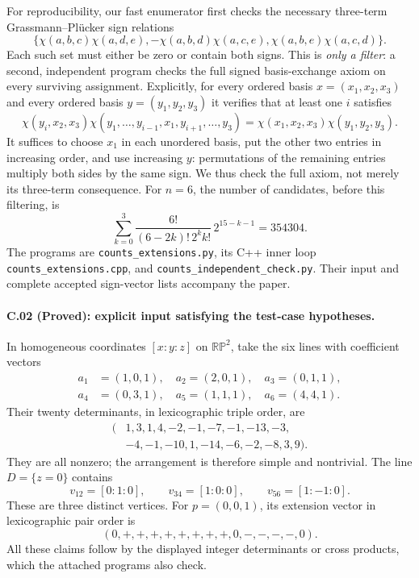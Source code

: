 For reproducibility, our fast enumerator first checks the necessary
three-term Grassmann--Pl\"ucker sign relations
\[
 \bigl\{
 \chi(a,b,c)\chi(a,d,e),
 -\chi(a,b,d)\chi(a,c,e),
 \chi(a,b,e)\chi(a,c,d)
 \bigr\}.
\]
Each such set must either be zero or contain both signs. This is
\emph{only a filter}: a second, independent program checks the full
signed basis-exchange axiom on every surviving assignment. Explicitly,
for every ordered basis $x=(x_1,x_2,x_3)$ and every ordered basis
$y=(y_1,y_2,y_3)$ it verifies that at least one $i$ satisfies
\[
 \chi(y_i,x_2,x_3)
 \chi(y_1,\ldots,y_{i-1},x_1,y_{i+1},\ldots,y_3)
 =\chi(x_1,x_2,x_3)\chi(y_1,y_2,y_3).
\]
It suffices to choose $x_1$ in each unordered basis, put the other two
entries in increasing order, and use increasing $y$: permutations of
the remaining entries multiply both sides by the same sign. We thus
check the full axiom, not merely its three-term consequence. For
$n=6$, the number of candidates, before this filtering, is
\[
 \sum_{k=0}^{3}
 \frac{6!}{(6-2k)!\,2^k k!}\,2^{15-k-1}=354304.
\]
The programs are \texttt{counts\_extensions.py}, its C++ inner loop
\texttt{counts\_extensions.cpp}, and
\texttt{counts\_independent\_check.py}. Their input and complete accepted
sign-vector lists accompany the paper.

\paragraph{C.02 (Proved): explicit input satisfying the test-case hypotheses.}
In homogeneous coordinates $[x:y:z]$ on $\mathbb{RP}^2$, take the six
lines with coefficient vectors
\[
\begin{split}
 a_1&=(1,0,1),\quad a_2=(2,0,1),\quad
 a_3=(0,1,1),\\
 a_4&=(0,3,1),\quad a_5=(1,1,1),\quad
 a_6=(4,4,1).
\end{split}
\]
Their twenty determinants, in lexicographic triple order, are
\[
\begin{split}
(&1,3,1,4,-2,-1,-7,-1,-13,-3,\\
 &-4,-1,-10,1,-14,-6,-2,-8,3,9).
\end{split}
\]
They are all nonzero; the arrangement is therefore simple and
nontrivial. The line $D=\{z=0\}$ contains
\[
 v_{12}=[0:1:0],\qquad
 v_{34}=[1:0:0],\qquad
 v_{56}=[1:-1:0].
\]
These are three distinct vertices. For $p=(0,0,1)$, its extension
vector in lexicographic pair order is
\[
 (0,+,+,+,+,+,+,+,+,0,-,-,-,-,0).
\]
All these claims follow by the displayed integer determinants or
cross products, which the attached programs also check.

